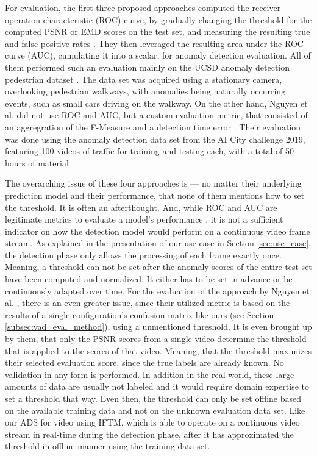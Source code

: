 For evaluation, the first three proposed approaches computed the receiver operation characteristic (ROC) curve, by gradually changing the threshold for the computed PSNR or EMD scores on the test set, and measuring the resulting true and false positive rates \cite{liu2018future, jamadandi2018predgan, dong2020dual}. They then leveraged the resulting area under the ROC curve (AUC), cumulating it into a scalar, for anomaly detection evaluation. All of them performed such an evaluation mainly on the UCSD anomaly detection pedestrian dataset \cite{mahadevan2010anomaly}. The data set was acquired using a stationary camera, overlooking pedestrian walkways, with anomalies being naturally occurring events, such as small cars driving on the walkway. On the other hand, Nguyen et al. did not use ROC and AUC, but a custom evaluation metric, that consisted of an aggregration of the F-Measure and a detection time error \cite{nguyen2020anomaly}. Their evaluation was done using the anomaly detection data set from the AI City challenge 2019, featuring 100 videos of traffic for training and testing each, with a total of 50 hours of material \cite{ai2029dataset}.

The overarching issue of these four approaches is --- no matter their underlying prediction model and their performance, that none of them mentions how to set the threshold. It is often an afterthought. And, while ROC and AUC are legitimate metrics to evaluate a model's performance \cite{bradley1997use}, it is not a sufficient indicator on how the detection model would perform on a continuous video frame stream. As explained in the presentation of our use case in Section \ref{sec:use_case}, the detection phase only allows the processing of each frame exactly once. Meaning, a threshold can not be set after the anomaly scores of the entire test set have been computed and normalized. It either has to be set in advance or be continuously adapted over time. For the evaluation of the approach by Nguyen et al. \cite{nguyen2020anomaly}, there is an even greater issue, since their utilized metric is based on the results of a single configuration's confusion matrix like ours (see Section \ref{subsec:vad_eval_method}), using a unmentioned threshold. It is even brought up by them, that only the PSNR scores from a single video determine the threshold that is applied to the scores of that video. Meaning, that the threshold maximizes their selected evaluation score, since the true labels are already known. No validation in any form is performed. In addition in the real world, these large amounts of data are usually not labeled and it would require domain expertise to set a threshold that way. Even then, the threshold can only be set offline based on the available training data and not on the unknown evaluation data set. Like our ADS for video using IFTM, which is able to operate on a continuous video stream in real-time during the detection phase, after it has approximated the threshold in offline manner using the training data set.

